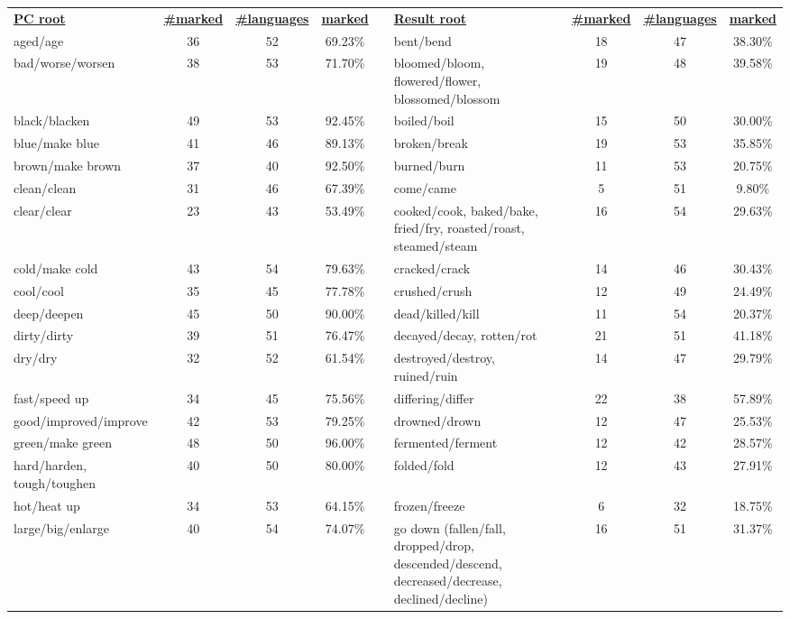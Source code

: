 \begin{tabular}{p{3cm}ccccp{3cm}ccc}
\underline{\textbf{PC root}} & \underline{\textbf{\#marked}} & \underline{\textbf{\#languages}} & \underline{\textbf{marked}} & & \underline{\textbf{Result root}} & \underline{\textbf{\#marked}} & \underline{\textbf{\#languages}} & \underline{\textbf{marked}} \\
aged/age & 36 & 52 & 69.23\% & & bent/bend & 18 & 47 & 38.30\% \\
bad/worse/worsen & 38 & 53 & 71.70\% & & bloomed/bloom, flowered/flower, blossomed/blossom & 19 & 48 & 39.58\% \\
black/blacken & 49 & 53 & 92.45\% & & boiled/boil & 15 & 50 & 30.00\% \\
blue/make blue & 41 & 46 & 89.13\% & & broken/break & 19 & 53 & 35.85\% \\
brown/make brown & 37 & 40 & 92.50\% & & burned/burn & 11 & 53 & 20.75\% \\
clean/clean & 31 & 46 & 67.39\% & & come/came & 5 & 51 & 9.80\% \\
clear/clear & 23 & 43 & 53.49\% & & cooked/cook, baked/bake, fried/fry, roasted/roast, steamed/steam & 16 & 54 & 29.63\% \\
cold/make cold & 43 & 54 & 79.63\% & & cracked/crack & 14 & 46 & 30.43\% \\
cool/cool & 35 & 45 & 77.78\% & & crushed/crush & 12 & 49 & 24.49\% \\
deep/deepen & 45 & 50 & 90.00\% & & dead/killed/kill & 11 & 54 & 20.37\% \\
dirty/dirty & 39 & 51 & 76.47\% & & decayed/decay, rotten/rot & 21 & 51 & 41.18\% \\
dry/dry & 32 & 52 & 61.54\% & & destroyed/destroy, ruined/ruin & 14 & 47 & 29.79\% \\
fast/speed up & 34 & 45 & 75.56\% & & differing/differ & 22 & 38 & 57.89\% \\
good/improved/improve & 42 & 53 & 79.25\% & & drowned/drown & 12 & 47 & 25.53\% \\
green/make green & 48 & 50 & 96.00\% & & fermented/ferment & 12 & 42 & 28.57\% \\
hard/harden, tough/toughen & 40 & 50 & 80.00\% & & folded/fold & 12 & 43 & 27.91\% \\
hot/heat up & 34 & 53 & 64.15\% & & frozen/freeze & 6 & 32 & 18.75\% \\
large/big/enlarge & 40 & 54 & 74.07\% & & go down (fallen/fall, dropped/drop, descended/descend, decreased/decrease, declined/decline) & 16 & 51 & 31.37\% \\

\end{tabular}
